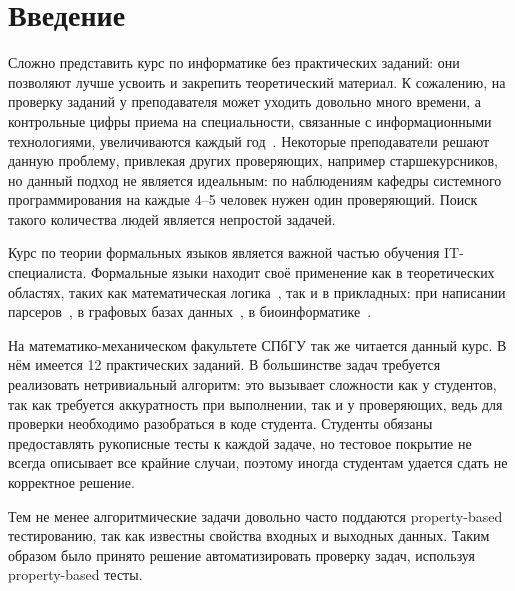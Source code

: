 
\section*{Введение}
\thispagestyle{withCompileDate}

Сложно представить курс по информатике без практических заданий: они позволяют лучше усвоить и закрепить теоретический материал.
К сожалению, на проверку заданий у преподавателя может уходить довольно много времени, а контрольные цифры приема на специальности, связанные с информационными технологиями, увеличиваются каждый год~\cite{2024GoduKolichestvo}.
Некоторые преподаватели решают данную проблему, привлекая других проверяющих, например старшекурсников, но данный подход не является идеальным: по наблюдениям кафедры системного программирования на каждые 4--5 человек нужен один проверяющий.
Поиск такого количества людей является непростой задачей.

Курс по теории формальных языков является важной частью обучения IT-специалиста.
Формальные языки находит своё применение как в теоретических областях, таких как математическая логика~\cite{guhaParikhAutomataInfinite2022,draghiciSemEnovArithmetic2023a}, так и в прикладных: при написании парсеров~\cite{gruneParsingTechniques2008, scottGLLParsing2010}, в графовых базах данных~\cite{hellingsQueryingPathsGraphs2016,noleRegularPathQueries2016}, в биоинформатике~\cite{dyrkaEstimatingProbabilisticContextfree2019,wjandersonEvolvingStochasticContext2012}.

На математико-механическом факультете СПбГУ так же читается данный курс.
В нём имеется 12 практических заданий.
В большинстве задач требуется реализовать нетривиальный алгоритм: это вызывает сложности как у студентов, так как требуется аккуратность при выполнении, так и у проверяющих, ведь для проверки необходимо разобраться в коде студента.
Студенты обязаны предоставлять рукописные тесты к каждой задаче, но тестовое покрытие не всегда описывает все крайние случаи, поэтому иногда студентам удается сдать не корректное решение.

Тем не менее алгоритмические задачи довольно часто поддаются property-based тестированию, так как известны свойства входных и выходных данных.
Таким образом было принято решение автоматизировать проверку задач, используя property-based тесты.
